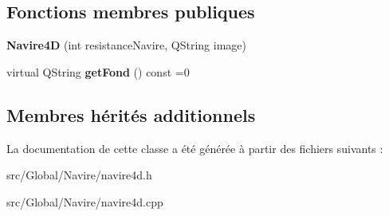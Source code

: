 \subsection*{Fonctions membres publiques}
\begin{DoxyCompactItemize}
\item 
{\bfseries Navire4D} (int resistance\+Navire, Q\+String image)\hypertarget{class_navire4_d_a016c727e460ec308ace8dad83413877d}{}\label{class_navire4_d_a016c727e460ec308ace8dad83413877d}

\item 
virtual Q\+String {\bfseries get\+Fond} () const  =0\hypertarget{class_navire4_d_aec41e6cc72972e2f67fd7eb335544538}{}\label{class_navire4_d_aec41e6cc72972e2f67fd7eb335544538}

\end{DoxyCompactItemize}
\subsection*{Membres hérités additionnels}


La documentation de cette classe a été générée à partir des fichiers suivants \+:\begin{DoxyCompactItemize}
\item 
src/\+Global/\+Navire/navire4d.\+h\item 
src/\+Global/\+Navire/navire4d.\+cpp\end{DoxyCompactItemize}
